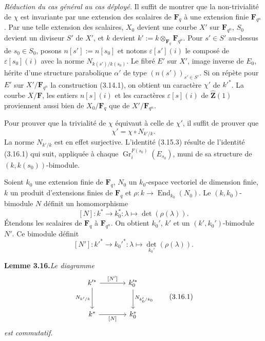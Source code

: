 \documentclass[11pt]{article}
\newcommand{\Fq}{\mathbf{F}_q}
\newcommand{\Fqn}{\mathbf{F}_{q^n}}
\newcommand{\F}{\mathbf{F}}
\newcommand{\End}{\operatorname{End}}
\newcommand{\Zhat}{\widehat{\mathbf{Z}}}
\newcommand{\Gr}{\operatorname{Gr}}
\begin{document}
\textit{Réduction du cas général au cas déployé.} Il suffit de montrer que la non-trivialité de \(\chi\) est invariante par une extension des scalaires de \(\Fq\) à une extension finie \(\Fqn\). Par une telle extension des scalaires, \(X_0\) devient une courbe \(X'\) sur \(\Fqn\), \(S_0\) devient un diviseur \(S'\) de \(X'\), et \(k\) devient \(k':=k\otimes_{\Fq}\Fqn\). Pour \(s'\in S'\) au-dessus de \(s_0\in S_0\), posons \(n[s']:=n[s_0]\) et notons \(\varepsilon[s'](i)\) le composé de \(\varepsilon[s_0](i)\) avec la norme \(N_{k(s')/k(s_0)}\). Le fibré \(E'\) sur \(X'\), image inverse de \(E_0\), hérite d'une structure parabolique \(\alpha'\) de type \((n(s'))_{s'\in S'}\). Si on répète pour \(E'\) sur \(X'/\Fqn\) la construction (3.14.1), on obtient un caractère \(\chi'\) de \(k'^*\). La courbe \(X/\F\), les entiers \(n[s](i)\) et les caractères \(\varepsilon[s](i)\) de \(\Zhat(1)\) proviennent aussi bien de \(X_0/\Fq\) que de \(X'/\Fqn\).

Pour prouver que la trivialité de \(\chi\) équivaut à celle de \(\chi'\), il suffit de prouver que
\begin{equation}
  \chi'=\chi\circ N_{k'/k}.
\tag{3.15.3}
\end{equation}
La norme \(N_{k'/k}\) est en effet surjective. L'identité (3.15.3) résulte de l'identité (3.16.1) qui suit, appliquée à chaque \(\Gr_i^{F(s_0)}(E_{s_0})\), muni de sa structure de \((k,k(s_0))\)-bimodule.

Soient \(k_0\) une extension finie de \(\Fq\), \(N_0\) un \(k_0\)-espace vectoriel de dimension finie, \(k\) un produit d'extensions finies de \(\Fq\) et \(\rho:k\to\End_{k_0}(N_0)\). Le \((k,k_0)\)-bimodule \(N\) définit un homomorphisme
\[
  [N]:k^*\longrightarrow k_0^*:\lambda\longmapsto\det(\rho(\lambda)).
\]
Étendons les scalaires de \(\Fq\) à \(\Fqn\). On obtient \(k_0'\), \(k'\) et un \((k',k_0')\)-bimodule \(N'\). Ce bimodule définit
\[
  [N']:k'^*\longrightarrow k_0'^*:\lambda\longmapsto\det_{k_0'}(\rho(\lambda)).
\]

\noindent\textbf{Lemme 3.16.}\quad\textit{Le diagramme}
\begin{equation}
\begin{tikzcd}[column sep=large,row sep=large]
{k'^*} \arrow[r,"{[N']}" ] \arrow[d,"{N_{k'/k}}"'] & {k_0'^*} \arrow[d,"{N_{k_0'/k_0}}"] \\
{k^*} \arrow[r,"{[N]}"'] & {k_0^*}
\end{tikzcd}
\tag{3.16.1}
\end{equation}
\textit{est commutatif.}
\end{document}
